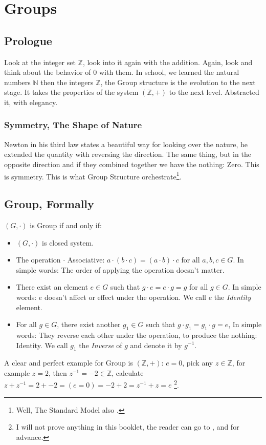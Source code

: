 \section{Groups \label{group}}
\subsection{Prologue}
Look at the integer set $\mathbb{Z}$, look into it again with the addition. Again, look and think about the behavior of $0$ with them. In school, we learned the natural numbers $\mathbb{N}$ then the integers $\mathbb{Z}$, the Group structure is the evolution to the next stage. It takes the properties of the system $(\mathbb{Z},+)$ to the next level. Abstracted it, with elegancy.

\subsubsection{Symmetry, The Shape of Nature}
Newton in his third law states a beautiful way for looking over the nature, he extended the quantity with reversing the direction. The same thing, but in the opposite direction and if they combined together we have the nothing: Zero. This is symmetry. This is what Group Structure orchestrate\footnote{Well, The Standard Model also \cite{enwiki:1038581383}.}.

\subsection{Group, Formally}

$(G,\cdot)$ is Group if and only if:
\begin{itemize}
   \item $(G,\cdot)$ is closed system.
   \item The operation $\cdot$ Associative: $a \cdot (b \cdot c) = (a \cdot b) \cdot c$ for all $a,b,c \in G$. In simple words: The order of applying the operation doesn't matter.
   \item There exist an element $e \in G$ such that $g \cdot e = e \cdot g = g$ for all $g \in G$. In simple words: $e$ doesn't affect or effect under the operation. We call $e$ the {\it Identity} element.
   \item For all $g \in G$, there exist another $g_1 \in G$ such that $g \cdot g_1 = g_1 \cdot g = e$, In simple words: They reverse each other under the operation, to produce the nothing: Identity. We call $g_1$ the {\it Inverse} of $g$ and denote it by $g^{-1}$.
\end{itemize}
A clear and perfect example for Group is $(\mathbb{Z},+)$: $e = 0$, pick any $z \in \mathbb{Z}$, for example $z = 2$, then $z^{-1}=-2 \in \mathbb{Z}$, calculate $z + z^{-1} = 2 + -2 = ( e = 0 ) = -2 + 2 = z^{-1} + z = e$ \footnote{I will not prove anything in this booklet, the reader can go to  \cite{fraleigh2003a}, and \cite{beardon2005algebra} for advance.}.

